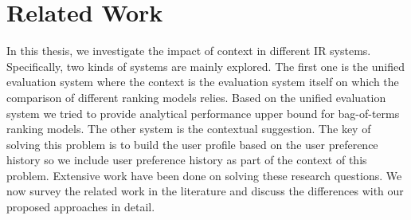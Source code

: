 %
%
\chapter{Related Work}

In this thesis, we investigate the impact of context in different IR systems. 
Specifically, two kinds of systems are mainly explored. 
The first one is the unified evaluation system where the context is the 
evaluation system itself on which the comparison of different ranking models 
relies. Based on the unified evaluation system we tried to provide analytical 
performance upper bound for bag-of-terms ranking models. 
The other system is the contextual suggestion. The key of solving this 
problem is to build the user profile based on the user preference history 
so we include user preference history as part of the context of this problem. 
Extensive work have been done on solving these research questions. 
We now survey the related work in the literature and discuss the differences
with our proposed approaches in detail.


